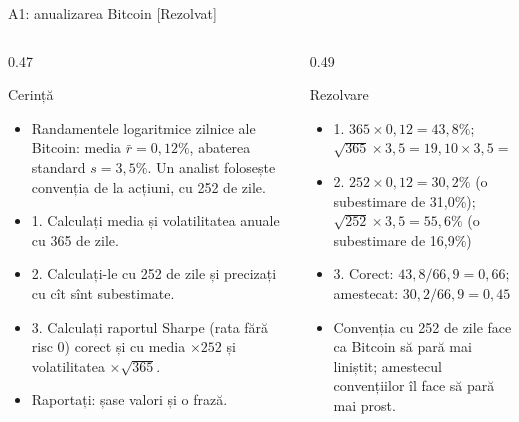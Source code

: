 \begin{frame}{A1: anualizarea Bitcoin [Rezolvat]}
\itemsize{\scriptsize}
\begin{columns}[T]
\begin{column}{0.47\textwidth}
\begin{block}{Cerință}
\begin{itemize}
    \item Randamentele logaritmice zilnice ale Bitcoin: media $\bar r = 0{,}12\%$, abaterea standard $s = 3{,}5\%$. Un analist folosește convenția de la acțiuni, cu 252 de zile.
    \item 1. Calculați media și volatilitatea anuale cu 365 de zile.
    \item 2. Calculați-le cu 252 de zile și precizați cu cît sînt subestimate.
    \item 3. Calculați raportul Sharpe (rata fără risc 0) corect și cu media $\times 252$ și volatilitatea $\times\sqrt{365}$.
    \item Raportați: șase valori și o frază.
\end{itemize}
\end{block}
\end{column}
\begin{column}{0.49\textwidth}
\begin{exampleblock}{Rezolvare}
\begin{itemize}
    \item 1. $365 \times 0{,}12 = 43{,}8\%$; $\sqrt{365} \times 3{,}5 = 19{,}10 \times 3{,}5 = 66{,}9\%$
    \item 2. $252 \times 0{,}12 = 30{,}2\%$ (o subestimare de 31{,}0\%); $\sqrt{252} \times 3{,}5 = 55{,}6\%$ (o subestimare de 16{,}9\%)
    \item 3. Corect: $43{,}8/66{,}9 = 0{,}66$; amestecat: $30{,}2/66{,}9 = 0{,}45$
    \item Convenția cu 252 de zile face ca Bitcoin să pară mai liniștit; amestecul convențiilor îl face să pară mai prost.
\end{itemize}
\end{exampleblock}
\end{column}
\end{columns}
\end{frame}

